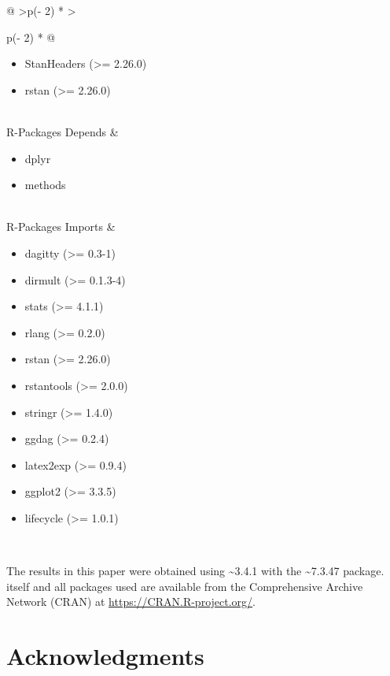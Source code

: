 \documentclass[
  11pt,
  article]{jss}
\providecommand{\tightlist}{%
  \setlength{\itemsep}{0pt}\setlength{\parskip}{0pt}}\usepackage{longtable,booktabs,array}
\begin{document}
\begin{longtable}[]{@{}
  >{\raggedleft\arraybackslash}p{(\columnwidth - 2\tabcolsep) * }
  >{\raggedright\arraybackslash}p{(\columnwidth - 2\tabcolsep) * }@{}}
\begin{minipage}[t]{\linewidth}
\begin{itemize}
  BH (\textgreater= 1.66.0)
\item
  StanHeaders (\textgreater= 2.26.0)
\item
  rstan (\textgreater= 2.26.0)
\end{itemize}
\end{minipage} \\
R-Packages Depends & \begin{minipage}[t]{\linewidth}\raggedright
\begin{itemize}
\tightlist
\item
  dplyr
\item
  methods
\end{itemize}
\end{minipage} \\
R-Packages Imports & \begin{minipage}[t]{\linewidth}\raggedright
\begin{itemize}
\tightlist
\item
  dagitty (\textgreater= 0.3-1)
\item
  dirmult (\textgreater= 0.1.3-4)
\item
  stats (\textgreater= 4.1.1)
\item
  rlang (\textgreater= 0.2.0)
\item
  rstan (\textgreater= 2.26.0)
\item
  rstantools (\textgreater= 2.0.0)
\item
  stringr (\textgreater= 1.4.0)
\item
  ggdag (\textgreater= 0.2.4)
\item
  latex2exp (\textgreater= 0.9.4)
\item
  ggplot2 (\textgreater= 3.3.5)
\item
  lifecycle (\textgreater= 1.0.1)
\end{itemize}
\end{minipage} \\
\end{longtable}

The results in this paper were obtained using
\textasciitilde3.4.1 with the
\textasciitilde7.3.47 package.  itself and all
packages used are available from the Comprehensive  Archive
Network (CRAN) at \url{https://CRAN.R-project.org/}.

\section*{Acknowledgments}\label{acknowledgments}
\end{document}
